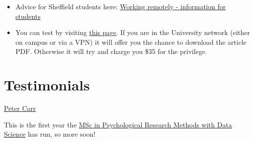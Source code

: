 \documentclass[]{book}
\providecommand{\tightlist}{%
  \setlength{\itemsep}{0pt}\setlength{\parskip}{0pt}}
\begin{document}
\begin{itemize}
\tightlist
\item
  Advice for Sheffield students here:
  \href{https://www.sheffield.ac.uk/it-services/remote/students}{Working
  remotely - information for students}
\item
  You can test by visiting
  \href{https://journals.sagepub.com/doi/full/10.1177/0956797613511466}{this
  page}. If you are in the University network (either on campus or via a
  VPN) it will offer you the chance to download the article PDF.
  Otherwise it will try and charge you \$35 for the privilege.
\end{itemize}

\section{Testimonials}\label{testimonials}

\href{https://www.sheffield.ac.uk/psychology/prospectivepg/masters/stories/peter-carr-1.817457}{Peter
Carr}

This is the first year the
\href{https://www.sheffield.ac.uk/psychology/prospectivepg/masters/data-science}{MSc
in Psychological Research Methods with Data Science} has run, so more
soon!


\end{document}
